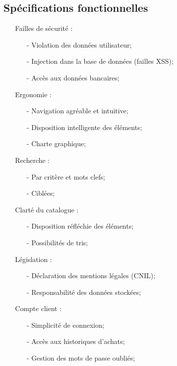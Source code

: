 \documentclass[a4paper]{article}
\begin{document}
	\subsection{Spécifications fonctionnelles}
	\begin{itemize}
		\item[]{Failles de sécurité :}
			\begin{itemize}
				\item[-] Violation des données utilisateur;
				\item[-] Injection dans la base de données (failles XSS);
				\item[-] Accès aux données bancaires;  
			\end{itemize}
		\item[]{Ergonomie :}
			\begin{itemize}
				\item[-] Navigation agréable et intuitive;
				\item[-] Disposition intelligente des éléments;
				\item[-] Charte graphique;
			\end{itemize}
		\item[]{Recherche : }
			\begin{itemize}
				\item[-] Par critère et mots clefs;
				\item[-] Ciblées;
			\end{itemize}
		\item[]{Clarté du catalogue :}
			\begin{itemize}
				\item[-] Disposition réfléchie des éléments;
				\item[-] Possibilités de tris;
			\end{itemize}
		\item[]{Législation :}
			\begin{itemize}
				\item[-] Déclaration des mentions légales (CNIL);
				\item[-] Responsabilité des données stockées;
			\end{itemize}
		\item[]{Compte client :}
			\begin{itemize}
				\item[-] Simplicité de connexion;
				\item[-] Accès aux historiques d'achats;
				\item[-] Gestion des mots de passe oubliés;
			\end{itemize}

\end{itemize}
\end{document}
